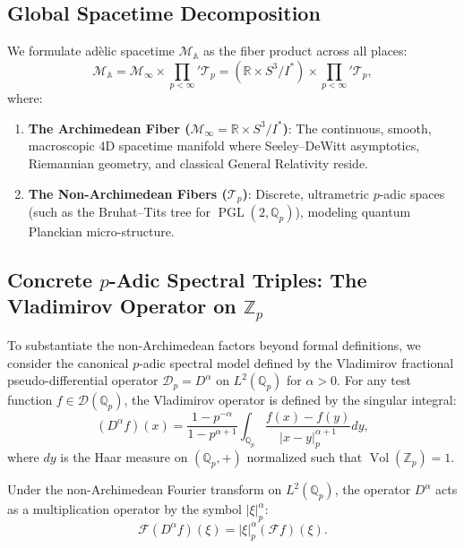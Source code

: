 \documentclass[11pt,a4paper]{article}
\theoremstyle{definition}
\DeclareMathOperator{\Vol}{Vol}
\DeclareMathOperator{\PGL}{PGL}
\begin{document}
\subsection{Global Spacetime Decomposition}
We formulate ad\`elic spacetime $\mathcal{M}_{\mathbb{A}}$ as the fiber product across all places:
\begin{equation}
\mathcal{M}_{\mathbb{A}} = \mathcal{M}_\infty \times {\prod_{p < \infty}}' \mathcal{T}_p = \left( \mathbb{R} \times S^3 / I^* \right) \times {\prod_{p < \infty}}' \mathcal{T}_p,
\end{equation}
where:
\begin{enumerate}
\item \textbf{The Archimedean Fiber ($\mathcal{M}_\infty = \mathbb{R} \times S^3 / I^*$)}: The continuous, smooth, macroscopic 4D spacetime manifold where Seeley--DeWitt asymptotics, Riemannian geometry, and classical General Relativity reside.
\item \textbf{The Non-Archimedean Fibers ($\mathcal{T}_p$)}: Discrete, ultrametric $p$-adic spaces (such as the Bruhat--Tits tree for $\PGL(2, \mathbb{Q}_p)$), modeling quantum Planckian micro-structure.
\end{enumerate}

\subsection{Concrete $p$-Adic Spectral Triples: The Vladimirov Operator on $\mathbb{Z}_p$}
To substantiate the non-Archimedean factors beyond formal definitions, we consider the canonical $p$-adic spectral model defined by the Vladimirov fractional pseudo-differential operator $\mathcal{D}_p = D^{\alpha}$ on $L^2(\mathbb{Q}_p)$ for $\alpha > 0$. For any test function $f \in \mathcal{D}(\mathbb{Q}_p)$, the Vladimirov operator is defined by the singular integral:
\begin{equation}
(D^\alpha f)(x) = \frac{1 - p^{-\alpha}}{1 - p^{\alpha + 1}} \int_{\mathbb{Q}_p} \frac{f(x) - f(y)}{|x - y|_p^{\alpha + 1}} dy,
\end{equation}
where $dy$ is the Haar measure on $(\mathbb{Q}_p, +)$ normalized such that $\Vol(\mathbb{Z}_p) = 1$.

Under the non-Archimedean Fourier transform on $L^2(\mathbb{Q}_p)$, the operator $D^\alpha$ acts as a multiplication operator by the symbol $|\xi|_p^\alpha$:
\begin{equation}
\mathcal{F}(D^\alpha f)(\xi) = |\xi|_p^\alpha (\mathcal{F} f)(\xi).
\end{equation}
\end{document}
